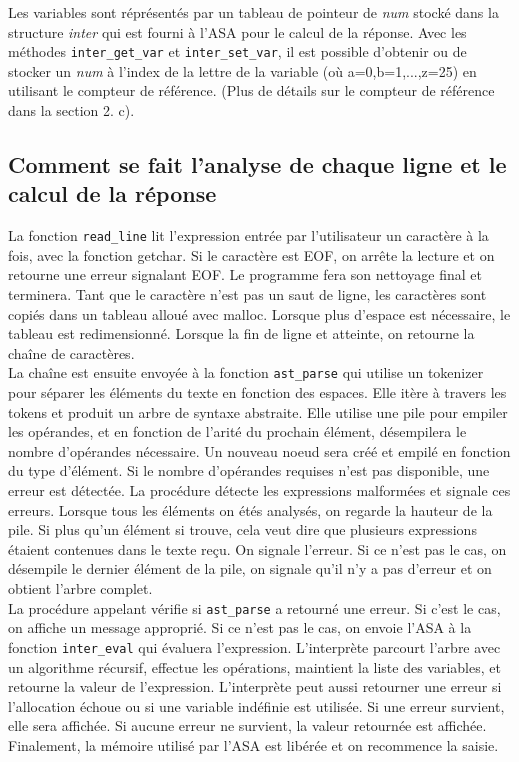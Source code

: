 \documentclass[a4paper,12pt,french]{article}
\begin{document}
		Les variables sont réprésentés par un tableau de pointeur de \textit{num} stocké dans la structure \textit{inter} qui est fourni à l'ASA pour le calcul de la réponse. Avec les méthodes \lstinline$inter_get_var$ et \lstinline$inter_set_var$, il est possible d'obtenir ou de stocker un \textit{num} à l'index de la lettre de la variable (où a=0,b=1,...,z=25)  en utilisant le compteur de référence. (Plus de détails sur le compteur de référence dans la section 2. c).

	\subsection{Comment se fait l’analyse de chaque ligne et le calcul de la réponse}
		La fonction \lstinline$read_line$ lit l'expression entrée par l'utilisateur un caractère à la fois,
		avec la fonction getchar. Si le caractère est EOF, on arrête la lecture et on retourne
		une erreur signalant EOF. Le programme fera son nettoyage final et terminera. Tant que
		le caractère n'est pas un saut de ligne, les caractères sont copiés dans un tableau
		alloué avec malloc. Lorsque plus d'espace est nécessaire, le tableau est redimensionné.
		Lorsque la fin de ligne et atteinte, on retourne la chaîne de caractères.\\

		La chaîne est ensuite envoyée à la fonction \lstinline$ast_parse$ qui utilise un tokenizer pour séparer
		les éléments du texte en fonction des espaces. Elle itère à travers les tokens et produit un
		arbre de syntaxe abstraite. Elle utilise une pile pour empiler les opérandes, et en fonction
		de l'arité du prochain élément, désempilera le nombre d'opérandes nécessaire. Un nouveau
		noeud sera créé et empilé en fonction du type d'élément. Si le nombre d'opérandes requises
		n'est pas disponible, une erreur est détectée. La procédure détecte les expressions malformées
		et signale ces erreurs. Lorsque tous les éléments on étés analysés, on regarde la hauteur de
		la pile. Si plus qu'un élément si trouve, cela veut dire que plusieurs expressions étaient
		contenues dans le texte reçu. On signale l'erreur. Si ce n'est pas le cas, on désempile le dernier
		élément de la pile, on signale qu'il n'y a pas d'erreur et on obtient l'arbre complet.\\

		La procédure appelant vérifie si \lstinline$ast_parse$ a retourné une erreur. Si c'est le cas, on affiche
		un message approprié. Si ce n'est pas le cas, on envoie l'ASA à la fonction \lstinline$inter_eval$ qui évaluera
		l'expression. L'interprète parcourt l'arbre avec un algorithme récursif, effectue les opérations,
		maintient la liste des variables, et retourne la valeur de l'expression. L'interprète peut aussi
		retourner une erreur si l'allocation échoue ou si une variable indéfinie est utilisée. Si une erreur
		survient, elle sera affichée. Si aucune erreur ne survient, la valeur retournée est affichée.
		Finalement, la mémoire utilisé par l'ASA est libérée et on recommence la saisie.\\
\end{document}

